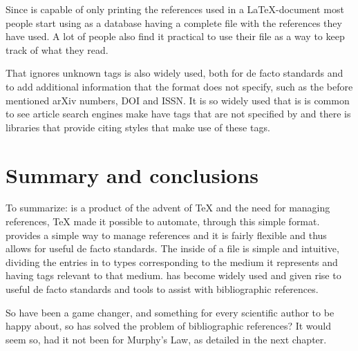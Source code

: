 Since {\bibtex} is capable of only printing the references used in a
{\LaTeX}-document most people start using {\bibtex} as a database
having a complete file with the references they have used.  A lot of
people also find it practical to use their {\bibtex} file as a way to
keep track of what they read.

That {\bibtex} ignores unknown tags is also widely used, both for de
facto standards and to add additional information that the format does
not specify, such as the before mentioned arXiv numbers, DOI and ISSN.
It is so widely used that is is common to see article search engines
make have tags that are not specified by {\bibtex} and there is
libraries that provide citing styles that make use of these tags.


\section{Summary and conclusions}
\label{sec:about_conclusion}

To summarize: {\bibtex} is a product of the advent of {\TeX} and the
need for managing references, {\TeX} made it possible to automate,
through this simple format.  {\bibtex} provides a simple way to manage
references and it is fairly flexible and thus allows for useful de
facto standards.  The inside of a {\bibtex} file is simple and
intuitive, dividing the entries in to types corresponding to the
medium it represents and having tags relevant to that medium.
{\bibtex} has become widely used and given rise to useful de facto
standards and tools to assist with bibliographic references.

So {\bibtex} have been a game changer, and something for every
scientific author to be happy about, so has {\bibtex} solved the
problem of bibliographic references? It would seem so, had it not been
for Murphy's Law, as detailed in the next chapter.


%
%
